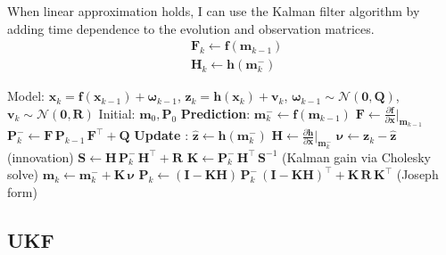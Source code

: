 \documentclass{article}
\begin{document}
When linear approximation holds, I can use the Kalman filter algorithm by adding time dependence to the evolution and observation matrices.
\begin{equation}
\begin{split}
&\mathbf{F}_k \leftarrow \mathbf{f}(\mathbf{m}_{k-1}) \\
&\mathbf{H}_k \leftarrow \mathbf{h}(\mathbf{m}^-_{k})
\end{split}
\end{equation}


\begin{algorithm}[H]
\caption{Extended Kalman Filter (EKF)}
\begin{algorithmic}[1]
\REQUIRE Model: $\mathbf{x}_k = \mathbf{f}(\mathbf{x}_{k-1}) + \boldsymbol{\omega}_{k-1}$,
  $\mathbf{z}_k = \mathbf{h}(\mathbf{x}_k) + \mathbf{v}_k$,
  $\boldsymbol{\omega}_{k-1} \sim \mathcal{N}(\mathbf{0},\mathbf{Q})$,
  $\mathbf{v}_k \sim \mathcal{N}(\mathbf{0},\mathbf{R})$
\REQUIRE Initial: $\mathbf{m}_0, \mathbf{P}_0$ 
  \STATE \textbf{Prediction}:
  \STATE $\mathbf{m}_k^{-} \leftarrow \mathbf{f}(\mathbf{m}_{k-1})$
  \STATE $\mathbf{F} \leftarrow \frac{\partial \mathbf{f}}{\partial \mathbf{x}}\Big|_{\mathbf{m}_{k-1}}$
  \STATE $\mathbf{P}_k^{-} \leftarrow \mathbf{F}\,\mathbf{P}_{k-1}\,\mathbf{F}^{\top} + \mathbf{Q}$
  \STATE \textbf{Update} :
  \STATE $\hat{\mathbf{z}} \leftarrow \mathbf{h}(\mathbf{m}_k^{-})$
  \STATE $\mathbf{H} \leftarrow \frac{\partial \mathbf{h}}{\partial \mathbf{x}}\Big|_{\mathbf{m}_k^{-}}$
  \STATE $\boldsymbol{\nu} \leftarrow \mathbf{z}_k - \hat{\mathbf{z}}$ \hfill (innovation)
  \STATE $\mathbf{S} \leftarrow \mathbf{H}\,\mathbf{P}_k^{-}\,\mathbf{H}^{\top} + \mathbf{R}$
  \STATE $\mathbf{K} \leftarrow \mathbf{P}_k^{-}\,\mathbf{H}^{\top}\,\mathbf{S}^{-1}$ \hfill (Kalman gain via Cholesky solve)
  \STATE $\mathbf{m}_k \leftarrow \mathbf{m}_k^{-} + \mathbf{K}\,\boldsymbol{\nu}$
  \STATE $\mathbf{P}_k \leftarrow (\mathbf{I} - \mathbf{K}\mathbf{H})\,\mathbf{P}_k^{-}\,(\mathbf{I} - \mathbf{K}\mathbf{H})^\top + \mathbf{K}\,\mathbf{R}\,\mathbf{K}^{\top}$ \hfill (Joseph form)
\ENDFOR
\end{algorithmic}
\end{algorithm}

\subsection{UKF}
\end{document}
